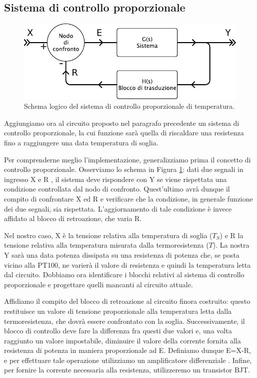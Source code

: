 \newpage
\subsection{Sistema di controllo proporzionale}

\begin{figure}
\centering
\includegraphics[width=.5\textwidth]{../E06/latex/s2.pdf}
\caption{Schema logico del sistema di controllo proporzionale di temperatura.}
\label{fig6:scheme2}
\end{figure}

Aggiungiamo ora al circuito proposto nel paragrafo precedente un sistema di controllo proporzionale, la cui funzione sarà quella di riscaldare una resistenza fino a raggiungere una data temperatura di soglia.

Per comprenderne meglio l'implementazione, generalizziamo prima il concetto di controllo proporzionale.
Osserviamo lo schema in Figura \ref{fig6:scheme2}: dati due segnali in ingresso X e R , il sistema deve rispondere con Y  se viene rispettata una condizione controllata dal nodo di confronto.
Quest'ultimo avrà dunque il compito di confrontare X ed R e verificare che la condizione, in generale funzione dei due segnali, sia rispettata.
L'aggiornamento di tale condizione è invece affidato al blocco di retroazione, che varia R.

Nel nostro caso, X è la tensione relativa alla temperatura di soglia ($T_{S}$) e R la tensione relativa alla temperatura misurata dalla termoresistenza ($T$).
La nostra Y sarà una data potenza dissipata su una resistenza di potenza che, se posta vicino alla PT100, ne varierà il valore di resistenza e quindi la temperatura letta dal circuito.
Dobbiamo ora identificare i blocchi relativi al sistema di controllo proporzionale e progettare quelli mancanti al circuito attuale.

Affidiamo il compito del blocco di retroazione al circuito finora costruito: questo restituisce un valore di tensione proporzionale alla temperatura letta dalla termoresistenza, che dovrà essere confrontato con la soglia.
Successivamente, il blocco di controllo deve fare la differenza fra questi due valori e, una volta raggiunto un valore impostabile, diminuire il valore della corrente fornita alla resistenza di potenza in maniera proporzionale ad E.
Definiamo dunque E=X-R, e per effettuare tale operazione utilizziamo un amplificatore differenziale .
Infine, per fornire la corrente necessaria alla resistenza, utilizzeremo un transistor BJT.

